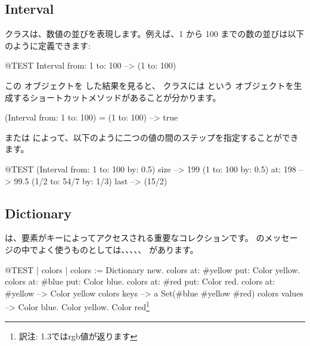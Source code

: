 \documentclass[a4paper,10pt,twoside]{book}
\begin{document}

\subsection{Interval}
 クラスは、数値の並びを表現します。例えば、1 から 100 までの数の並びは以下のように定義できます:
\begin{code}{@TEST}
Interval from: 1 to: 100 --> (1 to: 100)
\end{code}

\noindent
この  オブジェクトを  した結果を見ると、 クラスには  という  オブジェクトを生成するショートカットメソッドがあることが分かります。

\begin{code}{}
(Interval from: 1 to: 100) = (1 to: 100) --> true
\end{code}

 または  によって、以下のように二つの値の間のステップを指定することができます。

\begin{code}{@TEST}
(Interval from: 1 to: 100 by: 0.5) size --> 199
(1 to: 100 by: 0.5) at: 198 --> 99.5
(1/2 to: 54/7 by: 1/3) last --> (15/2)
\end{code}

\subsection{Dictionary}
は、要素がキーによってアクセスされる重要なコレクションです。
のメッセージの中でよく使うものとしては、、、、、 があります。

\begin{code}{@TEST | colors |}
colors := Dictionary new.
colors at: #yellow put: Color yellow.
colors at: #blue put: Color blue.
colors at: #red put: Color red.
colors at: #yellow --> Color yellow
colors keys          --> a Set(#blue #yellow #red)
colors values       --> {Color blue. Color yellow. Color red}\footnote{訳注: \pharo 1.3ではrgb値が返ります}
\end{code}
\end{document}
